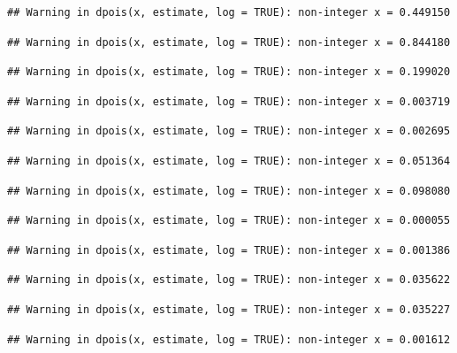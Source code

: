 \documentclass[]{article}
\begin{document}
\begin{verbatim}
## Warning in dpois(x, estimate, log = TRUE): non-integer x = 0.449150
\end{verbatim}

\begin{verbatim}
## Warning in dpois(x, estimate, log = TRUE): non-integer x = 0.844180
\end{verbatim}

\begin{verbatim}
## Warning in dpois(x, estimate, log = TRUE): non-integer x = 0.199020
\end{verbatim}

\begin{verbatim}
## Warning in dpois(x, estimate, log = TRUE): non-integer x = 0.003719
\end{verbatim}

\begin{verbatim}
## Warning in dpois(x, estimate, log = TRUE): non-integer x = 0.002695
\end{verbatim}

\begin{verbatim}
## Warning in dpois(x, estimate, log = TRUE): non-integer x = 0.051364
\end{verbatim}

\begin{verbatim}
## Warning in dpois(x, estimate, log = TRUE): non-integer x = 0.098080
\end{verbatim}

\begin{verbatim}
## Warning in dpois(x, estimate, log = TRUE): non-integer x = 0.000055
\end{verbatim}

\begin{verbatim}
## Warning in dpois(x, estimate, log = TRUE): non-integer x = 0.001386
\end{verbatim}

\begin{verbatim}
## Warning in dpois(x, estimate, log = TRUE): non-integer x = 0.035622
\end{verbatim}

\begin{verbatim}
## Warning in dpois(x, estimate, log = TRUE): non-integer x = 0.035227
\end{verbatim}

\begin{verbatim}
## Warning in dpois(x, estimate, log = TRUE): non-integer x = 0.001612
\end{verbatim}
\end{document}
